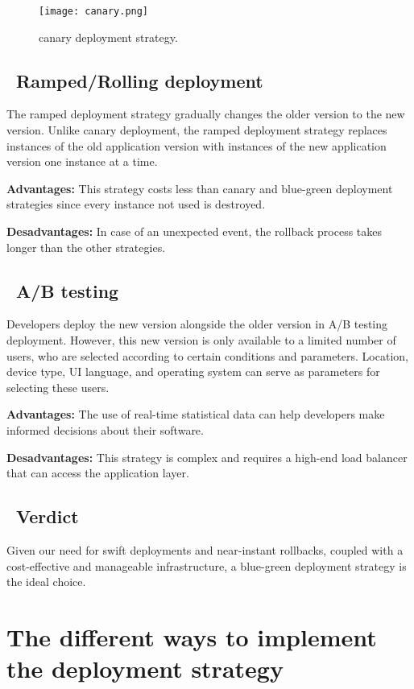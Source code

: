 \begin{figure}[H]
    \centering
    \texttt{[image: canary.png]}
    \caption{canary deployment strategy.}
    \label{fig:canary-deployment-strategy}
\end{figure}

\subsection*{ \textbullet\ Ramped/Rolling deployment}
The ramped deployment strategy gradually changes the older version to the new version. Unlike canary deployment, the ramped deployment strategy replaces instances of the old application version with instances of the new application version one instance at a time.
\par \noindent \textbf{Advantages:} This strategy costs less than canary and blue-green deployment strategies since every instance not used is destroyed.
\par \noindent \textbf{Desadvantages:} In case of an unexpected event, the rollback process takes longer than the other strategies.

\subsection*{ \textbullet\ A/B testing}
Developers deploy the new version alongside the older version in A/B testing deployment. However, this new version is only available to a limited number of users, who are selected according to certain conditions and parameters. Location, device type, UI language, and operating system can serve as parameters for selecting these users.
\par \noindent \textbf{Advantages:} The use of real-time statistical data can help developers make informed decisions about their software.
\par \noindent \textbf{Desadvantages:} This strategy is complex and requires a high-end load balancer that can access the application layer.

\subsection*{ \textbullet\ Verdict}
Given our need for swift deployments and near-instant rollbacks, coupled with a cost-effective and manageable infrastructure, a blue-green deployment strategy is the ideal choice.

\section{The different ways to implement the deployment strategy}

